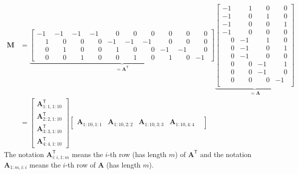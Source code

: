 \documentclass{article}
\begin{document}
\begin{align*}
    \mathbf{M} &= 
    \underbrace{\begin{bmatrix}
       -1 & - 1 & -1 & -1  & \phantom{-}0 & \phantom{-}0 & \phantom{-}0 & \phantom{-}0 & \phantom{-}0 & \phantom{-}0 \\
        \phantom{-}1 & \phantom{-}0 & \phantom{-}0 & \phantom{-}0 & -1 & - 1 & -1 & \phantom{-}0 & \phantom{-}0 & \phantom{-}0 \\
        \phantom{-}0 & \phantom{-}1 & \phantom{-}0 & \phantom{-}0  & \phantom{-}1 & \phantom{-}0 & \phantom{-}0 & -1 & -1 & \phantom{-}0 \\
        \phantom{-}0 & \phantom{-}0 & \phantom{-}1 & \phantom{-}0  & \phantom{-}0 & \phantom{-}1 & \phantom{-}0 & \phantom{-}1 & \phantom{-}0 & -1      
    \end{bmatrix}}_{= \mathbf{A}^{\mathsf{T}}}
    \underbrace{\begin{bmatrix}
    -1& \phantom{-}1 & \phantom{-}0  & \phantom{-}0 \\
    -1 & \phantom{-}0 & \phantom{-}1  & \phantom{-}0 \\
    -1 & \phantom{-}0 & \phantom{-}0 & \phantom{-}1 \\
    -1 & \phantom{-}0 & \phantom{-}0 & \phantom{-}0 \\
    \phantom{-}0 & -1 & \phantom{-}1 & \phantom{-}0 \\
    \phantom{-}0 & -1 & \phantom{-}0 & \phantom{-}1 \\
    \phantom{-}0 & -1 & \phantom{-}0 & \phantom{-}0 \\
    \phantom{-}0 & \phantom{-}0 & -1 & \phantom{-}1 \\
    \phantom{-}0 & \phantom{-}0 & -1 & \phantom{-}0 \\
    \phantom{-}0 & \phantom{-}0 & \phantom{-}0 & -1 \\
    \end{bmatrix}}_{= \mathbf{A}} \\[2mm]
    &= \begin{bmatrix}
        \mathbf{A}^{\mathsf{T}}_{1:1,1:10} \\
        \mathbf{A}^{\mathsf{T}}_{2:2,1:10} \\
        \mathbf{A}^{\mathsf{T}}_{3:3,1:10} \\
        \mathbf{A}^{\mathsf{T}}_{4:4,1:10}
    \end{bmatrix}
    \begin{bmatrix}
        \mathbf{A}_{1:10, 1:1} &
        \mathbf{A}_{1:10, 2:2} &
        \mathbf{A}_{1:10, 3:3} &
        \mathbf{A}_{1:10, 4:4} &
        \end{bmatrix} 
\end{align*}
The notation $\mathbf{A}^{\mathsf{T}}_{i:i,1:m}$ means the $i$-th row (has length $m$) of $\mathbf{A}^{\mathsf{T}}$ and the notation  $\mathbf{A}_{1:m, i:i}$ means the $i$-th row of $\mathbf{A}$ (has length $m$).
\end{document}
